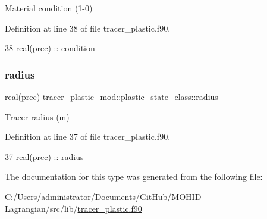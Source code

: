 Material condition (1-\/0) 



Definition at line 38 of file tracer\+\_\+plastic.\+f90.


\begin{DoxyCode}
38         \textcolor{keywordtype}{real(prec)} :: condition
\end{DoxyCode}
\mbox{\label{structtracer__plastic__mod_1_1plastic__state__class_a597b5dbe3ba58a0d58d7897fbadaea34}} 
\subsubsection{\texorpdfstring{radius}{radius}}
{\footnotesize\ttfamily real(prec) tracer\+\_\+plastic\+\_\+mod\+::plastic\+\_\+state\+\_\+class\+::radius\hspace{0.3cm}{\ttfamily [private]}}



Tracer radius (m) 



Definition at line 37 of file tracer\+\_\+plastic.\+f90.


\begin{DoxyCode}
37         \textcolor{keywordtype}{real(prec)} :: radius
\end{DoxyCode}


The documentation for this type was generated from the following file\+:\begin{DoxyCompactItemize}
\item 
C\+:/\+Users/administrator/\+Documents/\+Git\+Hub/\+M\+O\+H\+I\+D-\/\+Lagrangian/src/lib/\mbox{\hyperlink{tracer__plastic_8f90}{tracer\+\_\+plastic.\+f90}}\end{DoxyCompactItemize}
